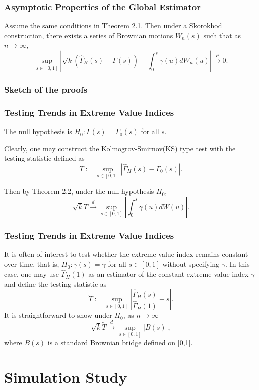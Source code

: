 \documentclass{beamer}
\newcommand{\abs}[1]{\left\vert#1\right\vert}
\begin{document}
\begin{frame}
    \frametitle{Asymptotic Properties of the Global Estimator}

    \begin{theorem}[2.2]
        Assume the same conditions in Theorem 2.1. Then under a Skorokhod  construction, there exists a series of Brownian motions $W_n(s)$ such that as $n \to \infty$,
$$
\sup _{s \in[0,1]}\left|\sqrt{k}\left(\hat{\Gamma}_{H}(s)-\Gamma(s)\right)-\int_{0}^{s} \gamma(u) d W_{n}(u)\right| \stackrel{P}{\rightarrow} 0.
$$
    \end{theorem}
    

\end{frame}


\begin{frame}
    \frametitle{Sketch of the proofs}

    

\end{frame}

\begin{frame}
    \frametitle{Testing Trends in Extreme Value Indices}
The null hypothesis is $H_0: \Gamma(s)=\Gamma_0(s)$ for all $s$.

\bigskip

Clearly, one may construct the Kolmogrov-Smirnov(KS) type test with the testing statistic defined as 
$$
T:=\sup_{s\in [0,1]} \abs{\hat{\Gamma}_H(s)-\Gamma_0(s)}.
$$

Then by Theorem 2.2, under the null hypothesis $H_0$,
$$
\sqrt{k} T \stackrel{d}{\rightarrow} \sup _{s \in[0,1]}\left|\int_{0}^{s} \gamma(u) d W(u)\right|.
$$
\end{frame}

\begin{frame}
    \frametitle{Testing Trends in Extreme Value Indices}
    It is often of interest to test whether the extreme value index remains constant over time, that is, $H_0 :\gamma(s)=\gamma$ for all $s \in [0,1]$ without specifying $\gamma$. In this case, one may use $\hat{\Gamma}_H(1)$  as an estimator of the constant extreme value index $\gamma$ and define the testing statistic as
    $$
    \tilde{T}:=\sup _{s \in[0,1]}\left|\frac{\hat{\Gamma}_{H}(s)}{\hat{\Gamma}_{H}(1)}-s\right|.
    $$
    It is straightforward to show under $H_0$, as $n \to \infty$
    $$
    \sqrt{k} \tilde{T} \stackrel{d}{\rightarrow} \sup _{s \in[0,1]}|B(s)|,
    $$
    where $B(s)$ is a standard Brownian bridge defined on [0,1].
\end{frame}


\section{Simulation Study}
\end{document}
